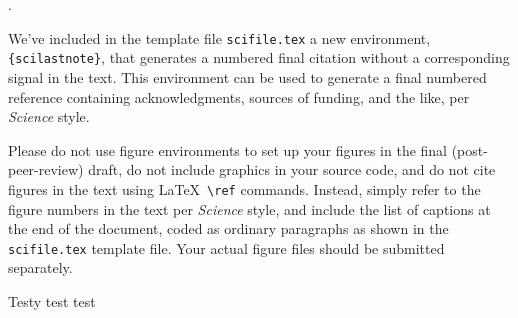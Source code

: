 \documentclass[12pt]{article}
\newcounter{lastnote}
\newenvironment{scilastnote}{%
\setcounter{lastnote}{\value{enumiv}}%
\addtocounter{lastnote}{+1}%
\begin{list}%
{\arabic{lastnote}.}
{\setlength{\leftmargin}{.22in}}
{\setlength{\labelsep}{.5em}}}
{\end{list}}
\begin{document}
\begin{scilastnote}
\item We've included in the template file \texttt{scifile.tex} a new
environment, \texttt{\{scilastnote\}}, that generates a numbered final
citation without a corresponding signal in the text.  This environment
can be used to generate a final numbered reference containing
acknowledgments, sources of funding, and the like, per {\it Science\/}
style.
\end{scilastnote}






\clearpage

 Please do not use figure environments to set
up your figures in the final (post-peer-review) draft, do not include graphics in your
source code, and do not cite figures in the text using \LaTeX\
\verb+\ref+ commands.  Instead, simply refer to the figure numbers in
the text per {\it Science\/} style, and include the list of captions at
the end of the document, coded as ordinary paragraphs as shown in the
\texttt{scifile.tex} template file.  Your actual figure files should
be submitted separately.

\begin{thebibliography}{99}
    Testy test test
\end{thebibliography}
\end{document}
